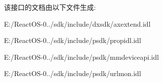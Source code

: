 该接口的文档由以下文件生成\+:\begin{DoxyCompactItemize}
\item 
E\+:/\+React\+O\+S-\/0../sdk/include/dxsdk/axextend.\+idl\item 
E\+:/\+React\+O\+S-\/0../sdk/include/psdk/propidl.\+idl\item 
E\+:/\+React\+O\+S-\/0../sdk/include/psdk/mmdeviceapi.\+idl\item 
E\+:/\+React\+O\+S-\/0../sdk/include/psdk/urlmon.\+idl\end{DoxyCompactItemize}
